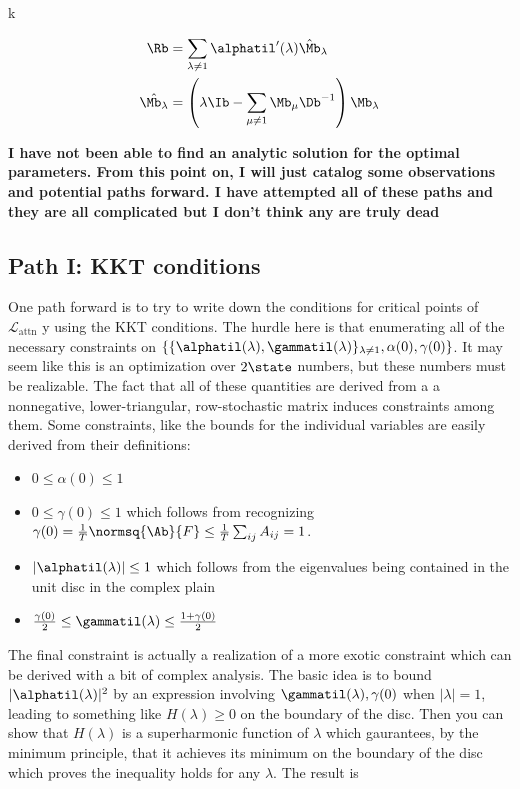 k\documentclass{article}
\begin{document}
\begin{align}
     \Rb &= \sum_{\lambda \neq 1}\alphatil'(\lambda) \hat{\Mb}_\lambda \\
     \hat{\Mb_\lambda} &= \left(\lambda\Ib - \sum_{\mu\neq1}\Mb_\mu\Db^{-1}\right)\Mb_\lambda
\end{align}

\textbf{I have not been able to find an analytic solution for the optimal parameters. From this point on, I will just catalog some observations and potential paths forward. I have attempted all of these paths and they are all complicated but I don't think any are truly dead}

\subsection{Path I: KKT conditions}
One path forward is to try to write down the conditions for critical points of $\mathcal{L}_{\text{attn}}$ y using the KKT conditions. The hurdle here is that enumerating all of the necessary constraints on $\left\{\{\alphatil(\lambda), \gammatil(\lambda)\}_{\lambda\neq1}, \alpha(0), \gamma(0)\right\}$. It may seem like this is an optimization over $2\state$ numbers, but these numbers must be realizable. The fact that all of these quantities are derived from a a nonnegative, lower-triangular, row-stochastic matrix induces constraints among them. Some constraints, like the bounds for the individual variables are easily derived from their definitions:

\begin{itemize}
    \item $0 \leq \alpha(0) \leq 1$ 
    \item $0 \leq \gamma(0) \leq 1$ which follows from recognizing $\gamma(0) = \frac{1}{T}\normsq{\Ab}{F} \leq \frac{1}{T}\sum_{ij} A_{ij} = 1$. 
    \item $\vert \alphatil(\lambda)\vert \le 1$ which follows from the eigenvalues being contained in the unit disc in the complex plain
    \item $\frac{\gamma(0)}{2} \leq \gammatil(\lambda) \leq \frac{1 + \gamma(0)}{2}$
\end{itemize}

The final constraint is actually a realization of a more exotic constraint which can be derived with a bit of complex analysis. The basic idea is to bound $|\alphatil(\lambda)|^2$ by an expression involving $\gammatil(\lambda), \gamma(0)$ when $|\lambda| = 1$, leading to something like $H(\lambda) \ge 0$ on the boundary of the disc. Then you can show that $H(\lambda)$ is a superharmonic function of $\lambda$
 which gaurantees, by the minimum principle, that it achieves its minimum on the boundary of the disc which proves the inequality holds for any $\lambda$. The result is 
\end{document}
